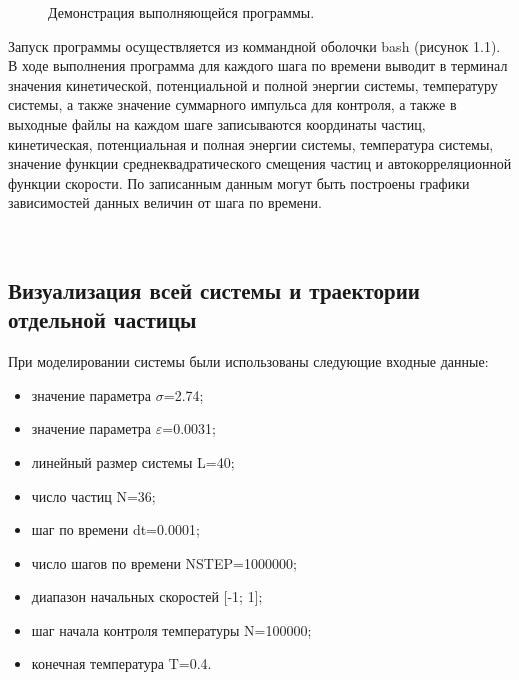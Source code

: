 \documentclass[14pt,a4paper,report]{ncc}
\begin{document}
\begin{figure}[h]
\caption{Демонстрация выполняющейся программы.}
\label{ris:image}
\end{figure}
Запуск программы осуществляется из коммандной оболочки bash (рисунок 1.1). В ходе выполнения программа для каждого шага по времени выводит в терминал значения кинетической, потенциальной и полной энергии системы, температуру системы, а также значение суммарного импульса для контроля, а также в выходные файлы на каждом шаге записываются координаты частиц, кинетическая, потенциальная и полная энергии системы, температура системы, значение функции среднеквадратического смещения частиц и автокорреляционной функции скорости. По записанным данным могут быть построены графики зависимостей данных величин от шага по времени.
\



\
\subsection{Визуализация всей системы и траектории отдельной частицы}
При моделировании системы были использованы следующие входные данные:
\begin{itemize}
\item значение параметра $\sigma$=2.74;
\item значение параметра $\varepsilon$=0.0031;
\item линейный размер системы L=40;
\item число частиц N=36;
\item шаг по времени dt=0.0001;
\item число шагов по времени NSTEP=1000000;
\item диапазон начальных скоростей [-1; 1];
\item шаг начала контроля температуры N=100000;
\item конечная температура T=0.4.
\end{itemize}
\
\end{document}
